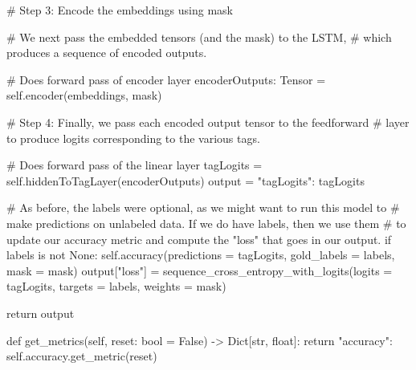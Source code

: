 \begin{pythonCode}
        # Step 3: Encode the embeddings using mask

        # We next pass the embedded tensors (and the mask) to the LSTM,
        # which produces a sequence of encoded outputs.

        # Does forward pass of encoder layer
        encoderOutputs: Tensor = self.encoder(embeddings, mask)


        # Step 4: Finally, we pass each encoded output tensor to the feedforward
        # layer to produce logits corresponding to the various tags.

        # Does forward pass of the linear layer
        tagLogits = self.hiddenToTagLayer(encoderOutputs)
        output = {"tagLogits": tagLogits}


        # As before, the labels were optional, as we might want to run this model to
        # make predictions on unlabeled data. If we do have labels, then we use them
        # to update our accuracy metric and compute the "loss" that goes in our output.
        if labels is not None:
            self.accuracy(predictions = tagLogits, gold_labels = labels, mask = mask)
            output["loss"] = sequence_cross_entropy_with_logits(logits = tagLogits,
                                                                targets = labels,
                                                                weights = mask)

        return output



    def get_metrics(self, reset: bool = False) -> Dict[str, float]:
        return {"accuracy": self.accuracy.get_metric(reset)}
\end{pythonCode}